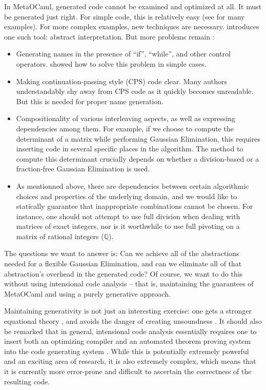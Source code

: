 \documentclass{llncs}
\begin{document}
In MetaOCaml, generated code cannot be examined and optimized at all. It must
be generated just right.  For simple code, this is relatively easy
(see \cite{TahaThesis} for many examples).  For more complex examples,
new techniques are necessary.  \cite{KiselyovTaha} introduces one
such tool: abstract interpretation.  But more problems remain
\cite{Padua:MetaOcaml:04}:
\begin{itemize}
    \item Generating names in the presence of ``if'', ``while'', and other
        control operators. \cite{KiselyovTaha} showed how to solve
        this problem in simple cases.
    \item Making continuation-passing style (CPS) code clear.  Many
        authors understandably shy away from CPS code as it quickly
        becomes unreadable.  But this is needed for proper name
        generation.
    \item Compositionality of various interleaving aspects, as well
        as expressing dependencies among them.  For example, if we
        choose to compute the determinant of a matrix while performing
        Gaussian Elimination, this requires inserting code in 
        several specific places in the algorithm.  The method to
        compute this determinant crucially depends on whether 
        a division-based or a fraction-free Gaussian Elimination is
        used.
    \item As mentionned above, there are dependencies between
        certain algorithmic choices and properties of the
        underlying domain, and we would like to statically guarantee
        that inappropriate combinations cannot be chosen.  For instance,
        one should not attempt to use full division when dealing
        with matrices of exact integers, nor is it worthwhile to use
        full pivoting on a matrix of rational integers ($\mathbb Q $).
\end{itemize}
The questions we want to answer is:
Can we achieve all of the abstractions needed for a flexible 
Gaussian Elimination, and can
we eliminate all of that abstraction's overhead in the generated code?
Of course, we want to do this without using
intensional code analysis -- that is, maintaining the
guarantees of MetaOCaml and using a purely generative approach.

Maintaining generativity is not just an interesting exercise:
one gets a stronger equational theory \cite{Taha2000}, and avoids
the danger of creating unsoundness \cite{TahaThesis}.  It should
also be remarked that in general, intensional code analysis
essentially requires one to insert both an optimizing compiler and 
an automated theorem proving system into the code generating system
\cite{Pueschel:05,Kennedy01Telescoping,dongarra7,Veldhuizen:2004}.
While this is
potentially extremely powerful and an exciting area of research,
it is also extremely complex, which means that it is currently more
error-prone and difficult to ascertain the correctness of the 
resulting code.
\end{document}
